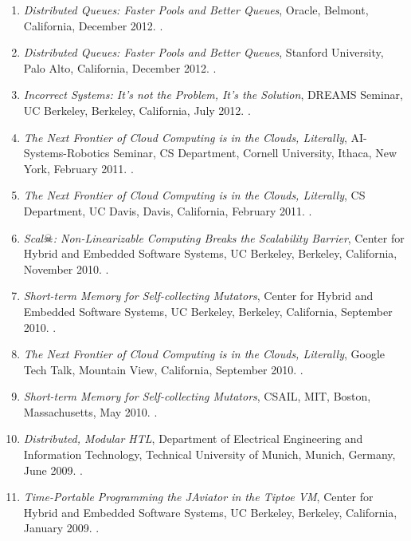 {\begin{enumerate}
\item \emph{Distributed Queues: Faster Pools and Better Queues},
Oracle, Belmont, California, December 2012.
.

\item \emph{Distributed Queues: Faster Pools and Better Queues},
Stanford University, Palo Alto, California, December 2012.
.

\item \emph{Incorrect Systems: It's not the Problem, It's the Solution},
DREAMS Seminar, UC Berkeley, Berkeley, California, July 2012.
.

\item \emph{The Next Frontier of Cloud Computing is in the Clouds, Literally}, AI-Systems-Robotics Seminar, CS Department, Cornell University, Ithaca, New York, February 2011.
.

\item \emph{The Next Frontier of Cloud Computing is in the Clouds, Literally}, CS Department, UC Davis, Davis, California, February 2011.
.

\item \emph{Scal$\skull$: Non-Linearizable Computing Breaks the Scalability Barrier},
Center for Hybrid and Embedded Software Systems, UC Berkeley, Berkeley, California, November 2010.
.

\item \emph{Short-term Memory for Self-collecting Mutators},
Center for Hybrid and Embedded Software Systems, UC Berkeley, Berkeley, California, September 2010.
.

\item \emph{The Next Frontier of Cloud Computing is in the Clouds, Literally}, Google Tech Talk, Mountain View, California, September 2010.
.

\item \emph{Short-term Memory for Self-collecting Mutators}, CSAIL, MIT, Boston, Massachusetts, May 2010.
.

\item \emph{Distributed, Modular HTL},
Department of Electrical Engineering and Information Technology, Technical University of Munich, Munich, Germany, June 2009.
.

\item \emph{Time-Portable Programming the JAviator in the Tiptoe VM},
Center for Hybrid and Embedded Software Systems, UC Berkeley, Berkeley, California, January 2009.
.


\end{enumerate}}

